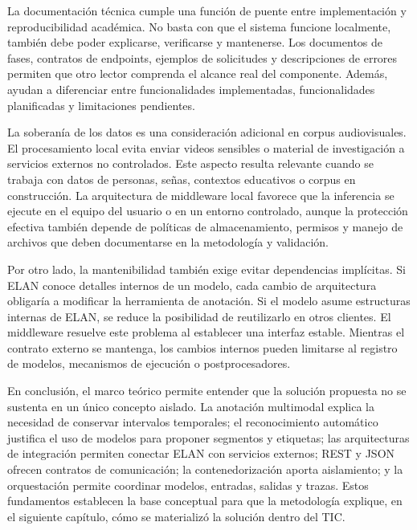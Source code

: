 La documentación técnica cumple una función de puente entre implementación y reproducibilidad académica. No basta con que el sistema funcione localmente, también debe poder explicarse, verificarse y mantenerse. Los documentos de fases, contratos de endpoints, ejemplos de solicitudes y descripciones de errores permiten que otro lector comprenda el alcance real del componente. Además, ayudan a diferenciar entre funcionalidades implementadas, funcionalidades planificadas y limitaciones pendientes.

La soberanía de los datos es una consideración adicional en corpus audiovisuales. El procesamiento local evita enviar videos sensibles o material de investigación a servicios externos no controlados. Este aspecto resulta relevante cuando se trabaja con datos de personas, señas, contextos educativos o corpus en construcción. La arquitectura de middleware local favorece que la inferencia se ejecute en el equipo del usuario o en un entorno controlado, aunque la protección efectiva también depende de políticas de almacenamiento, permisos y manejo de archivos que deben documentarse en la metodología y validación.

Por otro lado, la mantenibilidad también exige evitar dependencias implícitas. Si ELAN conoce detalles internos de un modelo, cada cambio de arquitectura obligaría a modificar la herramienta de anotación. Si el modelo asume estructuras internas de ELAN, se reduce la posibilidad de reutilizarlo en otros clientes. El middleware resuelve este problema al establecer una interfaz estable. Mientras el contrato externo se mantenga, los cambios internos pueden limitarse al registro de modelos, mecanismos de ejecución o postprocesadores.

En conclusión, el marco teórico permite entender que la solución propuesta no se sustenta en un único concepto aislado. La anotación multimodal explica la necesidad de conservar intervalos temporales; el reconocimiento automático justifica el uso de modelos para proponer segmentos y etiquetas; las arquitecturas de integración permiten conectar ELAN con servicios externos; REST y JSON ofrecen contratos de comunicación; la contenedorización aporta aislamiento; y la orquestación permite coordinar modelos, entradas, salidas y trazas. Estos fundamentos establecen la base conceptual para que la metodología explique, en el siguiente capítulo, cómo se materializó la solución dentro del TIC.

